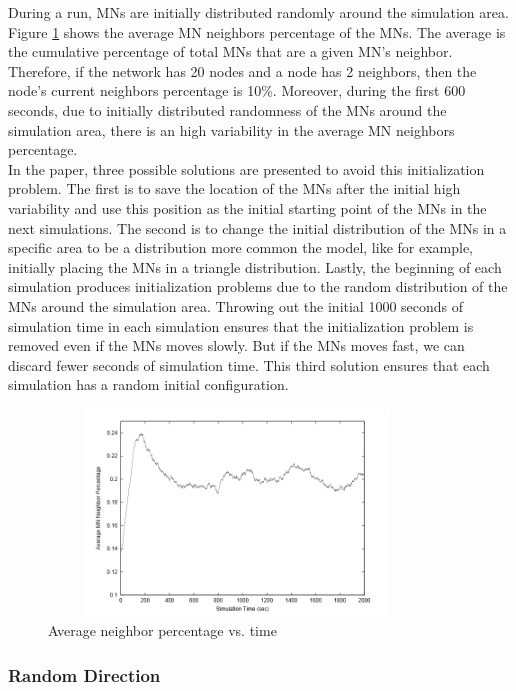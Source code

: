 During a run, MNs are initially distributed randomly around the simulation area. Figure \ref{RandomWaypointFig2} shows the average MN neighbors percentage of the MNs. The average is the cumulative percentage of total MNs that are a given MN's neighbor. Therefore, if the network has 20 nodes and a node has 2 neighbors, then the node's current neighbors percentage is 10\%. Moreover, during the first 600 seconds, due to initially distributed randomness of the MNs around the simulation area, there is an high variability in the average MN neighbors percentage.\\
In the paper, three possible solutions are presented to avoid this initialization problem. The first is to save the location of the MNs after the initial high variability and use this position as the initial starting point of the MNs in the next simulations. The second is to change the initial distribution of the MNs in a specific area to be a distribution more common the model, like for example, initially placing the MNs in a triangle distribution. Lastly, the beginning of each simulation produces initialization problems due to the random distribution of the MNs around the simulation area. Throwing out the initial 1000 seconds of simulation time in each simulation ensures that the initialization problem is removed even if the MNs moves slowly. But if the MNs moves fast, we can discard fewer seconds of simulation time. This third solution ensures that each simulation has a random initial configuration.\\

\begin{figure}[h]
\center
\includegraphics[width=10cm,height=55mm]{../images/randomwaypoint2.png}
\caption{\label{RandomWaypointFig2}Average neighbor percentage vs. time\cite{SurveyMobilityModelsAdHoc1}}
\end{figure}

\newpage

\subsubsection{Random Direction}

